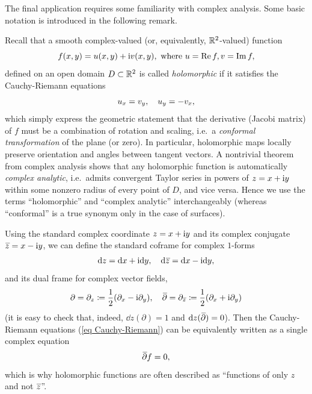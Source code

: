 The final application requires some familiarity with complex analysis. Some basic notation is introduced in the following remark.
\begin{rem}
    Recall that a smooth complex-valued (or, equivalently, $\mathbb{R}^2$-valued) function 
    \[f(x,y)=u(x,y)+\mathrm{i} v(x,y),\text{ where } u=\operatorname{Re} f,v=\operatorname{Im} f,\]
    defined on an open domain $D\subset\mathbb{R}^2$ is called \emph{holomorphic} if it satisfies the Cauchy-Riemann equations 
    \[u_x=v_y, \quad u_y=-v_x,\label{eq Cauchy-Riemann}\index{Equation!Cauchy-Riemann}\]
    which simply express the geometric statement that the derivative (Jacobi matrix) of $f$ must be a combination of rotation and scaling, i.e.\ a \emph{conformal transformation} of the plane (or zero). In particular, holomorphic maps locally preserve orientation and angles between tangent vectors. A nontrivial theorem from complex analysis shows that any holomorphic function is automatically \emph{complex analytic}, i.e.\ admits convergent Taylor series in powers of $z=x+\mathrm{i} y$ within some nonzero radius of every point of $D$, and vice versa. Hence we use the terms ``holomorphic'' and ``complex analytic'' interchangeably (whereas ``conformal'' is a true synonym only in the case of surfaces).

    Using the standard complex coordinate $z=x+\mathrm{i} y$ and its complex conjugate $\wb{z}=x-\i y$, we can define the standard coframe for complex $1$-forms
    \[\dd z=\dd x+\i \dd y,\quad \dd \wb{z}=\dd x-\i \dd y,\]
    and its dual frame for complex vector fields,
    \[\partial= \partial_z\coloneqq\frac{1}{2}(\partial_x-\i \partial_y),\quad \wb\partial= \partial_{\wb{z}}\coloneqq\frac{1}{2}(\partial_x+\i \partial_y)\]
    (it is easy to check that, indeed, $\dd z(\partial)=1$ and $\dd z(\wb\partial)=0$). Then the Cauchy-Riemann equations (\ref{eq Cauchy-Riemann}) can be equivalently written as a single complex equation
    \[\wb\partial f=0,\]
    which is why holomorphic functions are often described as ``functions of only $z$ and not $\wb{z}$''.


\end{rem}
